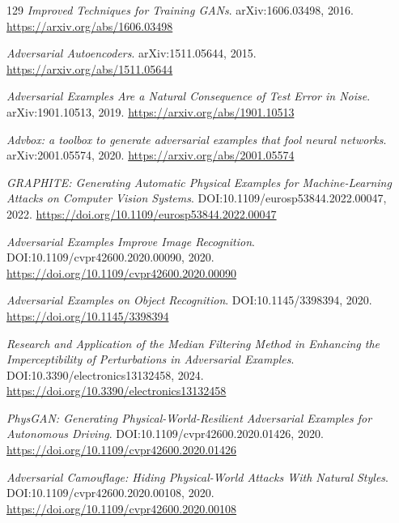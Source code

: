 \documentclass[11pt,a4paper]{article}
\begin{document}
\begin{thebibliography}{129}
\newblock \emph{Improved Techniques for Training GANs}.
\newblock arXiv:1606.03498, 2016.
\newblock \url{https://arxiv.org/abs/1606.03498}

\newblock \emph{Adversarial Autoencoders}.
\newblock arXiv:1511.05644, 2015.
\newblock \url{https://arxiv.org/abs/1511.05644}

\newblock \emph{Adversarial Examples Are a Natural Consequence of Test Error in Noise}.
\newblock arXiv:1901.10513, 2019.
\newblock \url{https://arxiv.org/abs/1901.10513}

\newblock \emph{Advbox: a toolbox to generate adversarial examples that fool neural networks}.
\newblock arXiv:2001.05574, 2020.
\newblock \url{https://arxiv.org/abs/2001.05574}

\newblock \emph{GRAPHITE: Generating Automatic Physical Examples for Machine-Learning Attacks on Computer Vision Systems}.
\newblock DOI:10.1109/eurosp53844.2022.00047, 2022.
\newblock \url{https://doi.org/10.1109/eurosp53844.2022.00047}

\newblock \emph{Adversarial Examples Improve Image Recognition}.
\newblock DOI:10.1109/cvpr42600.2020.00090, 2020.
\newblock \url{https://doi.org/10.1109/cvpr42600.2020.00090}

\newblock \emph{Adversarial Examples on Object Recognition}.
\newblock DOI:10.1145/3398394, 2020.
\newblock \url{https://doi.org/10.1145/3398394}

\newblock \emph{Research and Application of the Median Filtering Method in Enhancing the Imperceptibility of Perturbations in Adversarial Examples}.
\newblock DOI:10.3390/electronics13132458, 2024.
\newblock \url{https://doi.org/10.3390/electronics13132458}

\newblock \emph{PhysGAN: Generating Physical-World-Resilient Adversarial Examples for Autonomous Driving}.
\newblock DOI:10.1109/cvpr42600.2020.01426, 2020.
\newblock \url{https://doi.org/10.1109/cvpr42600.2020.01426}

\newblock \emph{Adversarial Camouflage: Hiding Physical-World Attacks With Natural Styles}.
\newblock DOI:10.1109/cvpr42600.2020.00108, 2020.
\newblock \url{https://doi.org/10.1109/cvpr42600.2020.00108}


\end{thebibliography}
\end{document}
